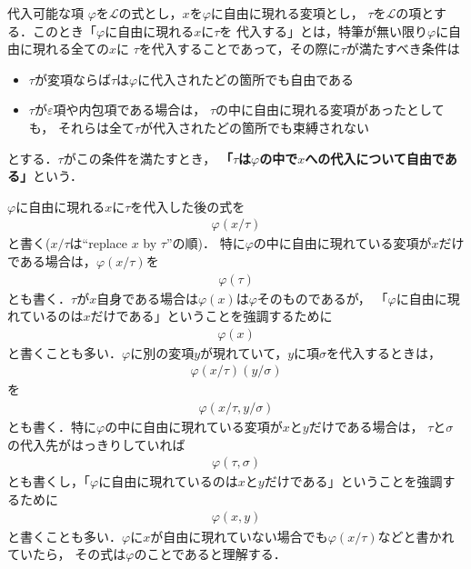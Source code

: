 	\begin{itembox}[l]{代入可能な項}
		$\varphi$を$\mathcal{L}$の式とし，$x$を$\varphi$に自由に現れる変項とし，
		$\tau$を$\mathcal{L}$の項とする．このとき「$\varphi$に自由に現れる$x$に$\tau$を
		代入する」とは，特筆が無い限り$\varphi$に自由に現れる全ての$x$に
		$\tau$を代入することであって，その際に$\tau$が満たすべき条件は
		\begin{itemize}
			\item $\tau$が変項ならば$\tau$は$\varphi$に代入されたどの箇所でも自由である
			\item $\tau$が$\varepsilon$項や内包項である場合は，
				$\tau$の中に自由に現れる変項があったとしても，
				それらは全て$\tau$が代入されたどの箇所でも束縛されない
		\end{itemize}
		とする．$\tau$がこの条件を満たすとき，
		{\bf 「$\tau$は$\varphi$の中で$x$への代入について自由である」}という．
	\end{itembox}
	
	$\varphi$に自由に現れる$x$に$\tau$を代入した後の式を
	\begin{align}
		\varphi(x/\tau)
	\end{align}
	と書く($x/\tau$は``replace $x$ by $\tau$''の順)．
	特に$\varphi$の中に自由に現れている変項が$x$だけである場合は，$\varphi(x/\tau)$を
	\begin{align}
		\varphi(\tau)
	\end{align}
	とも書く．$\tau$が$x$自身である場合は$\varphi(x)$は$\varphi$そのものであるが，
	「$\varphi$に自由に現れているのは$x$だけである」ということを強調するために
	\begin{align}
		\varphi(x)
	\end{align}
	と書くことも多い．$\varphi$に別の変項$y$が現れていて，$y$に項$\sigma$を代入するときは，
	\begin{align}
		\varphi(x/\tau)(y/\sigma)
	\end{align}
	を
	\begin{align}
		\varphi(x/\tau,y/\sigma)
	\end{align}
	とも書く．特に$\varphi$の中に自由に現れている変項が$x$と$y$だけである場合は，
	$\tau$と$\sigma$の代入先がはっきりしていれば
	\begin{align}
		\varphi(\tau,\sigma)
	\end{align}
	とも書くし，「$\varphi$に自由に現れているのは$x$と$y$だけである」ということを強調するために
	\begin{align}
		\varphi(x,y)
	\end{align}
	と書くことも多い．$\varphi$に$x$が自由に現れていない場合でも$\varphi(x/\tau)$などと書かれていたら，
	その式は$\varphi$のことであると理解する．